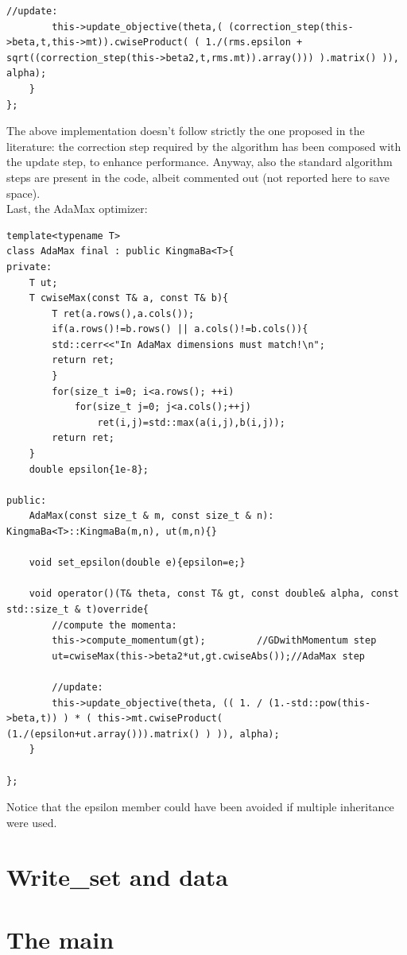\documentclass[12pt, a4paper]{report}
\theoremstyle{definition}
\begin{document}
{\begin{lstlisting}[frame=single, showstringspaces=false]
		//update:
		this->update_objective(theta,( (correction_step(this->beta,t,this->mt)).cwiseProduct( ( 1./(rms.epsilon + sqrt((correction_step(this->beta2,t,rms.mt)).array())) ).matrix() )), alpha);
	}	
};
\end{lstlisting}
The above implementation doesn't follow strictly the one proposed in the literature: the correction step required by the algorithm has been composed with the update step, to enhance performance. Anyway, also the standard algorithm steps are present in the code, albeit commented out (not reported here to save space).\\
Last, the AdaMax optimizer:
\begin{lstlisting}[frame=single, showstringspaces=false]
template<typename T>
class AdaMax final : public KingmaBa<T>{
private:
	T ut;
	T cwiseMax(const T& a, const T& b){
		T ret(a.rows(),a.cols());
		if(a.rows()!=b.rows() || a.cols()!=b.cols()){
		std::cerr<<"In AdaMax dimensions must match!\n";
		return ret;
		}
		for(size_t i=0; i<a.rows(); ++i)
			for(size_t j=0; j<a.cols();++j)
				ret(i,j)=std::max(a(i,j),b(i,j));
		return ret;
	}
	double epsilon{1e-8};
	
public:
	AdaMax(const size_t & m, const size_t & n): KingmaBa<T>::KingmaBa(m,n), ut(m,n){}

	void set_epsilon(double e){epsilon=e;}
	
	void operator()(T& theta, const T& gt, const double& alpha, const std::size_t & t)override{
		//compute the momenta:
		this->compute_momentum(gt);		  	//GDwithMomentum step
		ut=cwiseMax(this->beta2*ut,gt.cwiseAbs());//AdaMax step
	
		//update:
		this->update_objective(theta, (( 1. / (1.-std::pow(this->beta,t)) ) * ( this->mt.cwiseProduct( (1./(epsilon+ut.array())).matrix() ) )), alpha);
	}

};
\end{lstlisting}
Notice that the epsilon member could have been avoided if multiple inheritance were used.
\section{Write\_set and data}
\section{The main}



}
\end{document}
